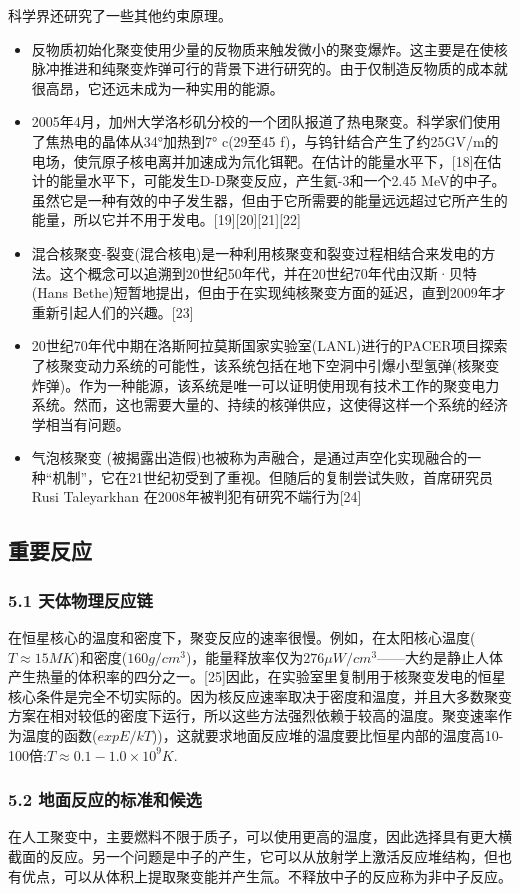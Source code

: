 科学界还研究了一些其他约束原理。
\begin{itemize}
\item 反物质初始化聚变使用少量的反物质来触发微小的聚变爆炸。这主要是在使核脉冲推进和纯聚变炸弹可行的背景下进行研究的。由于仅制造反物质的成本就很高昂，它还远未成为一种实用的能源。
\item 2005年4月，加州大学洛杉矶分校的一个团队报道了热电聚变。科学家们使用了焦热电的晶体从34°加热到7° c(29至45 f)，与钨针结合产生了约25GV/m的电场，使氘原子核电离并加速成为氘化铒靶。在估计的能量水平下，[18]在估计的能量水平下，可能发生D-D聚变反应，产生氦-3和一个2.45 MeV的中子。虽然它是一种有效的中子发生器，但由于它所需要的能量远远超过它所产生的能量，所以它并不用于发电。[19][20][21][22]
\item 混合核聚变-裂变(混合核电)是一种利用核聚变和裂变过程相结合来发电的方法。这个概念可以追溯到20世纪50年代，并在20世纪70年代由汉斯·贝特(Hans Bethe)短暂地提出，但由于在实现纯核聚变方面的延迟，直到2009年才重新引起人们的兴趣。[23]
\item 20世纪70年代中期在洛斯阿拉莫斯国家实验室(LANL)进行的PACER项目探索了核聚变动力系统的可能性，该系统包括在地下空洞中引爆小型氢弹(核聚变炸弹)。作为一种能源，该系统是唯一可以证明使用现有技术工作的聚变电力系统。然而，这也需要大量的、持续的核弹供应，这使得这样一个系统的经济学相当有问题。
\item 气泡核聚变 (被揭露出造假)也被称为声融合，是通过声空化实现融合的一种“机制”，它在21世纪初受到了重视。但随后的复制尝试失败，首席研究员Rusi Taleyarkhan 在2008年被判犯有研究不端行为[24]
\end{itemize}

\subsection{重要反应}
\subsubsection{5.1 天体物理反应链}
在恒星核心的温度和密度下，聚变反应的速率很慢。例如，在太阳核心温度($T\approx15 MK$)和密度($160 g/cm^3$)，能量释放率仅为$276 \mu W/cm^3$——大约是静止人体产生热量的体积率的四分之一。[25]因此，在实验室里复制用于核聚变发电的恒星核心条件是完全不切实际的。因为核反应速率取决于密度和温度，并且大多数聚变方案在相对较低的密度下运行，所以这些方法强烈依赖于较高的温度。聚变速率作为温度的函数($expE/kT$))，这就要求地面反应堆的温度要比恒星内部的温度高10-100倍:$T\approx0.1-1.0\times10^9K$.
\subsubsection{5.2 地面反应的标准和候选}
在人工聚变中，主要燃料不限于质子，可以使用更高的温度，因此选择具有更大横截面的反应。另一个问题是中子的产生，它可以从放射学上激活反应堆结构，但也有优点，可以从体积上提取聚变能并产生氚。不释放中子的反应称为非中子反应。

